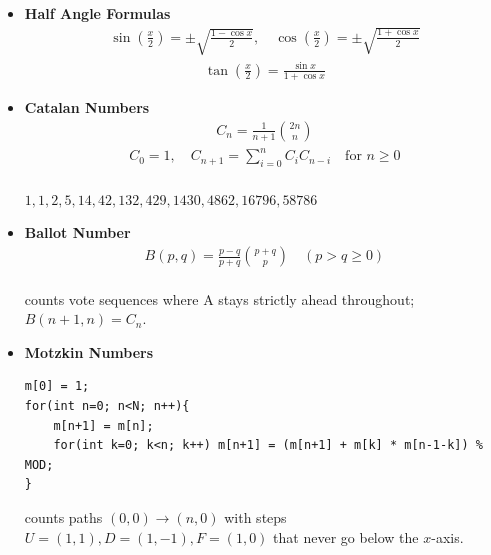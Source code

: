 \begin{itemize}
    \item \textbf{Half Angle Formulas} \\ 
    \begin{equation*}
    \begin{aligned}
    \sin\left(\frac{x}{2}\right) = \pm \sqrt{\frac{1 - \cos x}{2}}, \quad
\cos\left(\frac{x}{2}\right) = \pm \sqrt{\frac{1 + \cos x}{2}}
    \end{aligned}
    \end{equation*}
    \begin{equation*}
    \begin{aligned}
    \tan\left(\frac{x}{2}\right) = \frac{\sin x}{1 + \cos x}
    \end{aligned}
    \end{equation*}

    \item \textbf{Catalan Numbers} \\ 
    \begin{equation*}
    \begin{aligned}
    C_n = \frac{1}{n+1}\binom{2n}{n}
    \end{aligned}
    \end{equation*}
    \begin{equation*}
    \begin{aligned}
    C_0 = 1, \quad C_{n+1}=\sum_{i=0}^n C_i C_{n-i} \quad \text{for } n \geq 0
    \end{aligned}
    \end{equation*} \\ 
    $1, 1, 2, 5, 14, 42, 132, 429, 1430, 4862, 16796, 58786$

    \item \textbf{Ballot Number} \\
    \begin{equation*}
    \begin{aligned}
    B(p, q) = \frac{p-q}{p+q}\binom{p+q}{p} \quad (p > q \geq 0)
    \end{aligned}
    \end{equation*} \\
    counts vote sequences where A stays strictly ahead throughout; $B(n+1,n) = C_n$.

    \item \textbf{Motzkin Numbers}
\begin{verbatim}
m[0] = 1;
for(int n=0; n<N; n++){
    m[n+1] = m[n];
    for(int k=0; k<n; k++) m[n+1] = (m[n+1] + m[k] * m[n-1-k]) % MOD;
}
\end{verbatim}
    counts paths $(0,0) \to (n,0)$ with steps $U=(1,1), D=(1,-1), F=(1,0)$ that never go below the $x$-axis.


\end{itemize}
